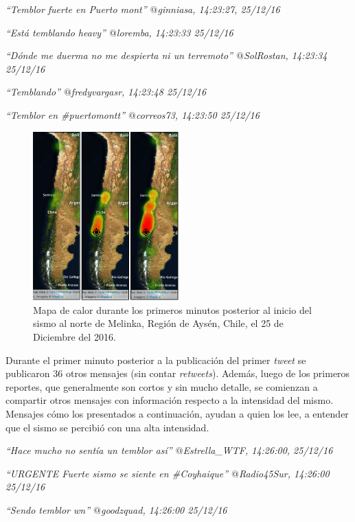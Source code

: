 \textit{``Temblor fuerte en Puerto mont'' $@$ginniasa, 14:23:27, 25/12/16}

\textit{``Está temblando heavy'' $@$loremba, 14:23:33 25/12/16}

\textit{``Dónde me duerma no me despierta ni un terremoto'' $@$SolRostan, 14:23:34 25/12/16}

\textit{``Temblando'' $@$fredyvargasr, 14:23:48 25/12/16}

\textit{``Temblor en \#puertomontt'' $@$correos73, 14:23:50 25/12/16}

	\begin{figure}[!ht]
	  \centering
	  \includegraphics[trim={0 0 0 0}, clip, width=0.5\textwidth]{imagenes/heatmap.pdf}
	  \caption{Mapa de calor durante los primeros minutos posterior al inicio del sismo al norte de Melinka, Región de Aysén, Chile, el 25 de Diciembre del 2016.}
		\label{fig:heatmap-timelapse}
	\end{figure}	
	
	Durante el primer minuto posterior a la publicación del primer \textit{tweet} se publicaron 36 otros mensajes (sin contar \textit{retweets}). Además, luego de los primeros reportes, que generalmente son cortos y sin mucho detalle, se comienzan a compartir otros mensajes con información respecto a la intensidad del mismo. Mensajes cómo los presentados a continuación, ayudan a quien los lee, a entender que el sismo se percibió con una alta intensidad. 
	

\textit{``Hace mucho no sentía un temblor así'' $@$Estrella\_WTF, 14:26:00, 25/12/16}

\textit{``URGENTE Fuerte sismo se siente en \#Coyhaique'' $@$Radio45Sur, 14:26:00 25/12/16}

\textit{``Sendo temblor wn'' $@$goodzquad, 14:26:00 25/12/16}

